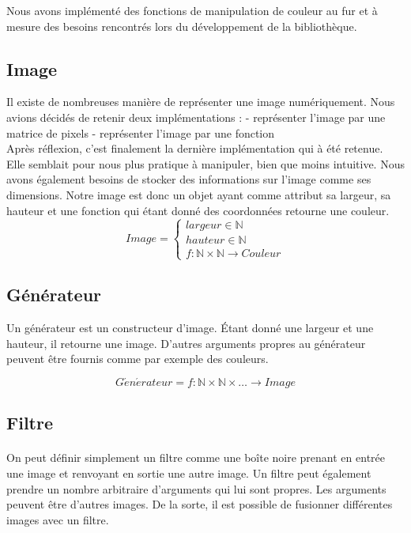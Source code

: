 \documentclass{article}
\begin{document}
Nous avons implémenté des fonctions de manipulation de couleur au fur et à mesure des besoins rencontrés lors du développement de la bibliothèque.

\subsection{Image}
\label{sec:image}

Il existe de nombreuses manière de représenter une image numériquement. Nous avions décidés de retenir deux implémentations : - représenter l'image par une matrice de pixels - représenter l'image par une fonction \\
Après réflexion, c'est finalement la dernière implémentation qui à été retenue. Elle semblait pour nous plus pratique à manipuler, bien que moins intuitive. Nous avons également besoins de stocker des informations sur l'image comme ses dimensions. Notre image est donc un objet ayant comme attribut sa largeur, sa hauteur et une fonction qui étant donné des coordonnées retourne une couleur.
\begin{equation*}
    Image = \left\{\begin{matrix}
            largeur \in \mathbb{N} \\
            hauteur \in \mathbb{N} \\ 
            f : \mathbb{N} \times \mathbb{N} \rightarrow Couleur
\end{matrix}\right.
\end{equation*}
 
\subsection{Générateur}

Un générateur est un constructeur d'image. Étant donné une largeur et une hauteur, il retourne une image. D'autres arguments propres au générateur peuvent être fournis comme par exemple des couleurs.

\begin{equation*}
    G\acute{e}n\acute{e}rateur = f : \mathbb{N} \times \mathbb{N} \times \dots \rightarrow Image
\end{equation*}

\subsection{Filtre}
\paragraph{}
On peut définir simplement un filtre comme une boîte noire prenant en entrée une image et renvoyant en sortie une autre image. Un filtre peut également prendre un nombre arbitraire d'arguments qui lui sont propres. Les arguments peuvent être d'autres images. De la sorte, il est possible de fusionner différentes images avec un filtre.
\end{document}

